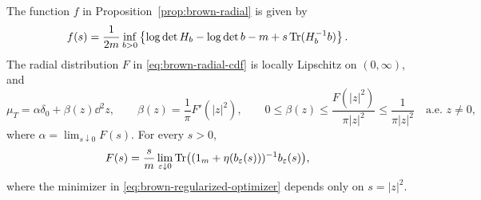 \begin{proposition}\label{prop:brown-radial-details}
The function $f$ in Proposition~\ref{prop:brown-radial} is given by
\begin{equation}\label{eq:brown-radial-envelope}
 f(s)=\frac1{2m}\inf_{b>0}
 \left\{\log\det H_b-\log\det b-m
                       +s\operatorname{Tr}(H_b^{-1}b)\right\}.
\end{equation}
The radial distribution $F$ in \eqref{eq:brown-radial-cdf} is locally Lipschitz on $(0,\infty)$, and
\begin{equation}\label{eq:brown-radial-density}
 \mu_T=\alpha\delta_0+\beta(z)\dd^2z,\qquad
 \beta(z)=\frac1\pi F'(|z|^2),\qquad
 0\le\beta(z)\le\frac{F(|z|^2)}{\pi|z|^2}
              \le\frac1{\pi|z|^2}\quad\text{a.e. }z\ne0,
\end{equation}
where $\alpha=\lim_{s\downarrow0}F(s)$.
For every $s>0$,
\begin{equation}\label{eq:brown-radial-optimizer}
 F(s)=\frac{s}{m}\lim_{\varepsilon\downarrow0}
 \operatorname{Tr}\bigl((1_m+\eta(b_\varepsilon(s)))^{-1}b_\varepsilon(s)\bigr),
\end{equation}
where the minimizer in \eqref{eq:brown-regularized-optimizer} depends only on $s=|z|^2$.
\end{proposition}
